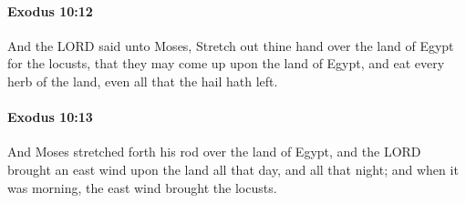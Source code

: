 		\paragraph{Exodus 10:12} %
			\label{EXODUS-10-12}

			And the LORD said unto Moses, Stretch out thine hand over the land of Egypt for the locusts, that they may come up upon the land of Egypt, and eat every herb of the land, even all that the hail hath left.


		\paragraph{Exodus 10:13} %
			\label{EXODUS-10-13}

			And Moses stretched forth his rod over the land of Egypt, and the LORD brought an east wind upon the land all that day, and all that night; and when it was morning, the east wind brought the locusts.

